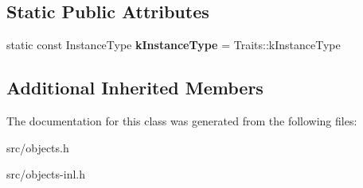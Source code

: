 \subsection*{Static Public Attributes}
\begin{DoxyCompactItemize}
\item 
\hypertarget{classv8_1_1internal_1_1_fixed_typed_array_a683d7488e8ff59a42f78a7fa20058d26}{}static const Instance\+Type {\bfseries k\+Instance\+Type} = Traits\+::k\+Instance\+Type\label{classv8_1_1internal_1_1_fixed_typed_array_a683d7488e8ff59a42f78a7fa20058d26}

\end{DoxyCompactItemize}
\subsection*{Additional Inherited Members}


The documentation for this class was generated from the following files\+:\begin{DoxyCompactItemize}
\item 
src/objects.\+h\item 
src/objects-\/inl.\+h\end{DoxyCompactItemize}
